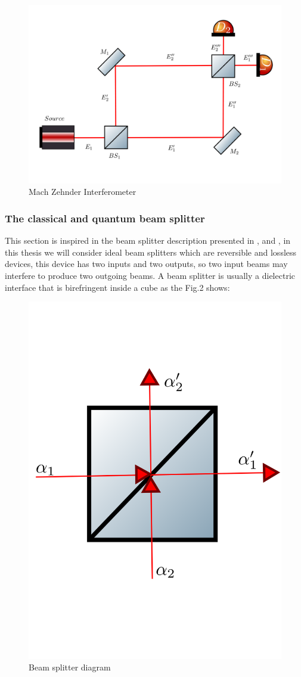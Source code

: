 \documentclass[12pt]{article}
\begin{document}
\begin{figure}[h]
\centering
\includegraphics[width=\linewidth]{images/machzenhdercla.png}
\caption{Mach Zehnder Interferometer}
\label{fig:BS2}
\end{figure}

\subsubsection{The classical and quantum beam splitter}

This section is inspired in the beam splitter description presented in \cite{Loudon},\cite{gerry} and \cite{leonhartd}, in this thesis we will consider ideal beam splitters which are reversible and lossless devices, this device has two inputs and two outputs, so two input beams may interfere to produce two outgoing beams. A beam splitter is usually a dielectric interface that is birefringent inside a cube as the Fig.2 shows: 

\begin{figure}[h]
\centering
\includegraphics[width=5 cm,height=5 cm]{images/bS.png}
\caption{Beam splitter diagram}
\label{fig:BS2}
\end{figure}
\end{document}
